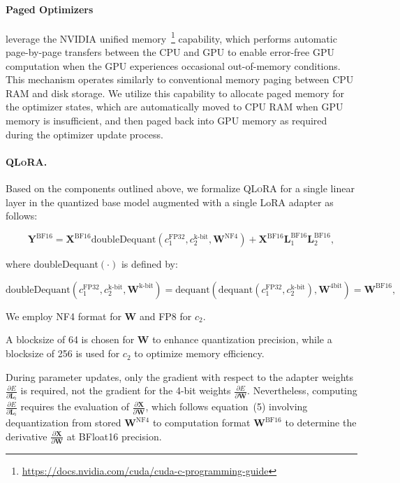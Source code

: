 \paragraph{Paged Optimizers} leverage the NVIDIA unified memory~\footnote{\tiny \url{https://docs.nvidia.com/cuda/cuda-c-programming-guide}} capability, which performs automatic page-by-page transfers between the CPU and GPU to enable error-free GPU computation when the GPU experiences occasional out-of-memory conditions. This mechanism operates similarly to conventional memory paging between CPU RAM and disk storage. We utilize this capability to allocate paged memory for the optimizer states, which are automatically moved to CPU RAM when GPU memory is insufficient, and then paged back into GPU memory as required during the optimizer update process.

\paragraph{\textsc{QLoRA}.} Based on the components outlined above, we formalize \textsc{QLoRA} for a single linear layer in the quantized base model augmented with a single LoRA adapter as follows:

\begin{equation}
    \mathbf{Y}^{\text{BF16}} =  \mathbf{X}^{\text{BF16}} \text{doubleDequant}(c_1^{\text{FP32}}, c_2^{\text{k-bit}}, \mathbf{W}^{\text{NF4}}) + \mathbf{X}^{\text{BF16}}\mathbf{L}^{\text{BF16}}_1\mathbf{L}^{\text{BF16}}_2,
\end{equation}

where doubleDequant$(\cdot)$ is defined by:

\begin{equation}
    \text{doubleDequant}(c_1^{\text{FP32}}, c_2^{\text{k-bit}}, \mathbf{W}^{\text{k-bit}}) = \text{dequant}(\text{dequant}(c_1^{\text{FP32}}, c_2^{\text{k-bit}}), \mathbf{W}^{\text{4bit}}) = \mathbf{W}^{\text{BF16}},
\end{equation}

We employ NF4 format for $\mathbf{W}$ and FP8 for $c_2$.

A blocksize of 64 is chosen for $\mathbf{W}$ to enhance quantization precision, while a blocksize of 256 is used for $c_2$ to optimize memory efficiency.

During parameter updates, only the gradient with respect to the adapter weights $\frac{\partial E}{\partial \mathbf{L}_i}$ is required, not the gradient for the 4-bit weights $\frac{\partial E}{\partial \mathbf{W}}$. Nevertheless, computing $\frac{\partial E}{\partial \mathbf{L}_i}$ requires the evaluation of $\frac{\partial \mathbf{X}}{\partial \mathbf{W}}$, which follows equation~(5) involving dequantization from stored $\mathbf{W}^{\text{NF4}}$ to computation format $\mathbf{W}^{\text{BF16}}$ to determine the derivative $\frac{\partial \mathbf{X}}{\partial \mathbf{W}}$ at BFloat16 precision.

